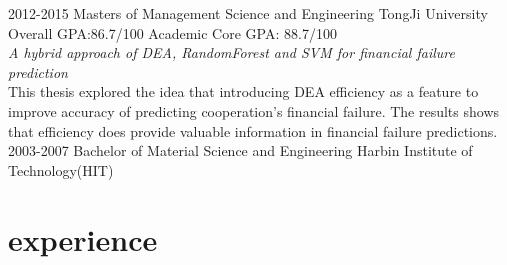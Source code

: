\documentclass[]{friggeri-cv} %
\begin{document}
\begin{entrylist}
\entry
{2012-2015}
{Masters {\normalfont of Management Science and Engineering}}
{TongJi University}
{Overall GPA:86.7/100 Academic Core GPA: 88.7/100\\
\emph{A hybrid approach of DEA, RandomForest and SVM for financial failure prediction} \\
This thesis explored the idea that introducing DEA efficiency as a feature to improve accuracy of predicting cooperation's financial failure. The results shows that efficiency does provide valuable information in financial failure predictions.}
\entry
{2003-2007}
{Bachelor {\normalfont of Material Science and Engineering}}
{Harbin Institute of Technology(HIT)}
{}
\end{entrylist}







\section{experience}
\end{document}
